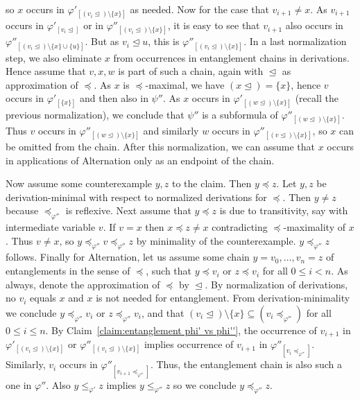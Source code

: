 \documentclass{LMCS}
\renewcommand{\phi}{\varphi}
\newcommand{\alt}{Alternation}
\begin{document}
so $x$ occurs in $\phi'_{[(v_i\trianglelefteq)\setminus\{x\}]}$ as needed. 
Now for the case that $v_{i+1}\not=x$. 
As $v_{i+1}$ occurs in $\phi'_{[v_i\trianglelefteq]}$ 
or in $\phi''_{[(v_i\trianglelefteq)\setminus\{x\}]}$, 
it is easy to see that $v_{i+1}$ 
also occurs in $\phi''_{[(v_i\trianglelefteq)\setminus\{x\}\cup\{u\}]}$. 
But as $v_i\trianglelefteq u$, 
this is $\phi''_{[(v_i\trianglelefteq)\setminus\{x\}]}$. 
In a last normalization step, we also eliminate $x$ 
from occurrences in entanglement chains in derivations. 
Hence assume that $v,x,w$ is part of such a chain, 
again with $\trianglelefteq$ as approximation of $\preceq$. 
As $x$ is $\preceq$-maximal, we have $(x\trianglelefteq)=\{x\}$, 
hence $v$ occurs in $\phi'_{[\{x\}]}$ and then also in $\psi''$. 
As $x$ occurs in $\phi'_{[(w\trianglelefteq)\setminus\{x\}]}$ 
(recall the previous normalization), 
we conclude that $\psi''$ is a subformula 
of $\phi''_{[(w\trianglelefteq)\setminus\{x\}]}$. 
Thus $v$ occurs in $\phi''_{[(w\trianglelefteq)\setminus\{x\}]}$ 
and similarly $w$ occurs in $\phi''_{[(v\trianglelefteq)\setminus\{x\}]}$, 
so $x$ can be omitted from the chain. 
After this normalization, we can assume 
that $x$ occurs in applications of \alt{} only as an endpoint of the chain. 

Now assume some counterexample $y,z$ to the claim. Then $y\preceq z$. 
Let $y,z$ be derivation-minimal 
with respect to normalized derivations for $\preceq$. 
Then $y\not=z$ because $\preceq_{\phi''}$ is reflexive. 
Next assume that $y\preceq z$ is due to transitivity, 
say with intermediate variable $v$. 
If $v=x$ then $x\preceq z\not=x$ contradicting $\preceq$-maximality of $x$. 
Thus $v\not=x$, 
so $y\preceq_{\phi''}v\preceq_{\phi''}z$ by minimality of the counterexample. 
$y\preceq_{\phi''}z$ follows. 
Finally for \alt, 
let us assume some chain $y=v_0,\ldots,v_n=z$ 
of entanglements in the sense of $\preceq$, 
such that $y\preceq v_i$ or $z\preceq v_i$ for all $0\leq i<n$. 
As always, denote the approximation of $\preceq$ by $\trianglelefteq$. 
By normalization of derivations, no $v_i$ equals $x$ 
and $x$ is not needed for entanglement. 
{}From derivation-minimality we conclude 
$y\preceq_{\phi''}v_i$ or $z\preceq_{\phi''}v_i$, 
and that $(v_i\trianglelefteq)\setminus\{x\}\subseteq(v_i\preceq_{\phi''})$ 
for all $0\leq i\leq n$. 
By Claim~\ref{claim:entanglement phi' vs phi''}, 
the occurrence of $v_{i+1}$ in $\phi'_{[(v_i\trianglelefteq)\setminus\{x\}]}$ 
or $\phi''_{[(v_i\trianglelefteq)\setminus\{x\}]}$ 
implies occurrence of $v_{i+1}$ in $\phi''_{[v_i\preceq_{\phi''}]}$. 
Similarly, $v_i$ occurs in $\phi''_{[v_{i+1}\preceq_{\phi''}]}$. 
Thus, the entanglement chain is also such a one in $\phi''$. 
Also $y\leq_{\phi'}z$ implies $y\leq_{\phi''}z$ 
so we conclude $y\preceq_{\phi''}z$. 
\cqed
\end{document}
